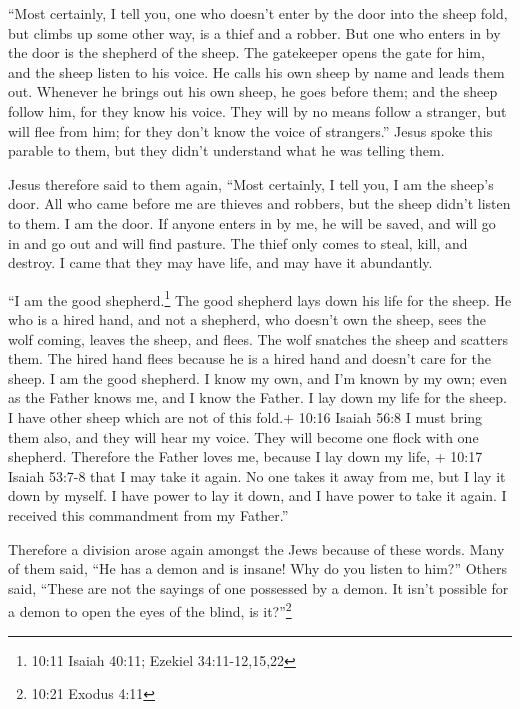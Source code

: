  ``Most certainly, I tell you, one who doesn't enter by the
door into the sheep fold, but climbs up some other way, is a thief and a
robber.  But one who enters in by the door is the shepherd
of the sheep.  The gatekeeper opens the gate for him, and
the sheep listen to his voice. He calls his own sheep by name and leads
them out.  Whenever he brings out his own sheep, he goes
before them; and the sheep follow him, for they know his voice.
 They will by no means follow a stranger, but will flee from
him; for they don't know the voice of strangers.''  Jesus
spoke this parable to them, but they didn't understand what he was
telling them.

 Jesus therefore said to them again, ``Most certainly, I
tell you, I am the sheep's door.  All who came before me are
thieves and robbers, but the sheep didn't listen to them.  I
am the door. If anyone enters in by me, he will be saved, and will go in
and go out and will find pasture.  The thief only comes to
steal, kill, and destroy. I came that they may have life, and may have
it abundantly.

 ``I am the good shepherd.\footnote{10:11 Isaiah 40:11;
  Ezekiel 34:11-12,15,22} The good shepherd lays down his life for the
sheep.  He who is a hired hand, and not a shepherd, who
doesn't own the sheep, sees the wolf coming, leaves the sheep, and
flees. The wolf snatches the sheep and scatters them.  The
hired hand flees because he is a hired hand and doesn't care for the
sheep.  I am the good shepherd. I know my own, and I'm
known by my own;  even as the Father knows me, and I know
the Father. I lay down my life for the sheep.  I have other
sheep which are not of this fold.+ 10:16 Isaiah 56:8 I must bring them
also, and they will hear my voice. They will become one flock with one
shepherd.  Therefore the Father loves me, because I lay
down my life, + 10:17 Isaiah 53:7-8 that I may take it again.
 No one takes it away from me, but I lay it down by myself.
I have power to lay it down, and I have power to take it again. I
received this commandment from my Father.''

 Therefore a division arose again amongst the Jews because
of these words.  Many of them said, ``He has a demon and is
insane! Why do you listen to him?''  Others said, ``These
are not the sayings of one possessed by a demon. It isn't possible for a
demon to open the eyes of the blind, is it?''\footnote{10:21 Exodus 4:11}

